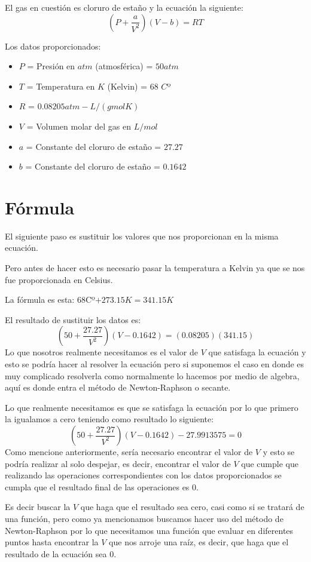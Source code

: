 \documentclass{article}
\begin{document}
El gas en cuestión es cloruro de estaño y la ecuación la siguiente:
$$ (P+\frac{a}{V^2})(V-b)=RT $$


Los datos proporcionados:
\begin{itemize}
   \item $P$ = Presión en $atm$ (atmosférica) = $50 atm$
   \item $T$ = Temperatura en $K$ (Kelvin) = $68$ $C$º
   \item $R$ = $0.08205 atm-L/(gmolK)$
   \item $V$ = Volumen molar del gas en $L/mol$
   \item $a$ = Constante del cloruro de estaño = $27.27$
   \item $b$ = Constante del cloruro de estaño = $0.1642$
\end{itemize}


\section{Fórmula}
El siguiente paso es sustituir los valores que nos proporcionan en la misma ecuación.


Pero antes de hacer esto es necesario pasar la temperatura a Kelvin ya que se nos fue proporcionada en Celsius.


La fórmula es esta: $68$Cº$+273.15K= 341.15K$




El resultado de sustituir los datos es:
$$ (50+\frac{27.27}{V^2})(V-0.1642)=(0.08205)(341.15) $$
Lo que nosotros realmente necesitamos es el valor de $V$ que satisfaga la ecuación y esto se podría hacer al resolver la ecuación pero si suponemos el caso en donde es muy complicado resolverla como normalmente lo hacemos por medio de algebra, aquí es donde entra el método de Newton-Raphson o secante.


Lo que realmente necesitamos es que se satisfaga la ecuación por lo que primero la igualamos a cero teniendo como resultado lo siguiente:
$$ (50+\frac{27.27}{V^2})(V-0.1642)-27.9913575=0$$
Como mencione anteriormente, sería necesario encontrar el valor de $V$ y esto se podría realizar al solo despejar, es decir, encontrar el valor de $V$ que cumple que realizando las operaciones correspondientes con los datos proporcionados se cumpla que el resultado final de las operaciones es 0.


Es decir buscar la $V$ que haga que el resultado sea cero, casi como si se tratará de una función, pero como ya mencionamos buscamos hacer uso del método de Newton-Raphson por lo que necesitamos una función que evaluar en diferentes puntos hasta encontrar la $V$ que nos arroje una raíz, es decir, que haga que el resultado de la ecuación sea 0.
\end{document}
